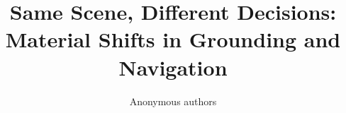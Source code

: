 \documentclass{article}
\title{Same Scene, Different Decisions:\\Material Shifts in Grounding and Navigation}
\author{Anonymous authors}
\begin{document}
\raggedbottom
\maketitle








\FloatBarrier
\label{page:main-end}



\clearpage
\appendix

\end{document}
